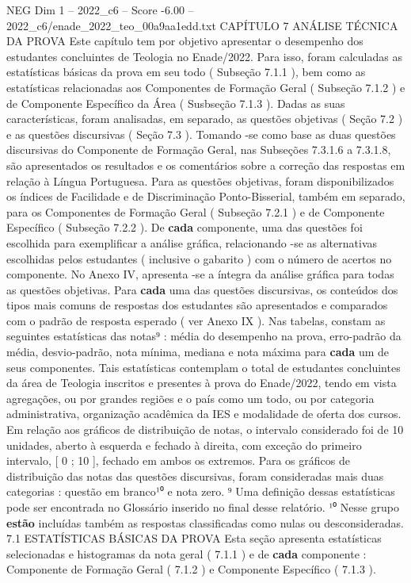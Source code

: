 \begin{textsample}{NEG Dim 1 – 2022\_c6 – Score -6.00 – 2022\_c6/enade\_2022\_teo\_00a9aa1edd.txt}  \label{ex:f1_neg_183}
CAPÍTULO 7 ANÁLISE TÉCNICA DA PROVA Este capítulo tem por objetivo apresentar o desempenho dos estudantes concluintes de Teologia no Enade/2022.
Para isso, foram calculadas as estatísticas básicas da prova em seu todo ( Subseção 7.1.1 ), bem como as estatísticas relacionadas aos Componentes de Formação Geral ( Subseção 7.1.2 ) e de Componente Específico da Área ( Susbseção 7.1.3 ).
Dadas as suas características, foram analisadas, em separado, as questões objetivas ( Seção 7.2 ) e as questões discursivas ( Seção 7.3 ).
Tomando -se como base as duas questões discursivas do Componente de Formação Geral, nas Subseções 7.3.1.6 a 7.3.1.8, são apresentados os resultados e os comentários sobre a correção das respostas em relação à Língua Portuguesa.
Para as questões objetivas, foram disponibilizados os índices de Facilidade e de Discriminação Ponto-Bisserial, também em separado, para os Componentes de Formação Geral ( Subseção 7.2.1 ) e de Componente Específico ( Subseção 7.2.2 ).
De \textbf{cada} componente, uma das questões foi escolhida para exemplificar a análise gráfica, relacionando -se as alternativas escolhidas pelos estudantes ( inclusive o gabarito ) com o número de acertos no componente.
No Anexo IV, apresenta -se a íntegra da análise gráfica para todas as questões objetivas.
Para \textbf{cada} uma das questões discursivas, os conteúdos dos tipos mais comuns de respostas dos estudantes são apresentados e comparados com o padrão de resposta esperado ( ver Anexo IX ).
Nas tabelas, constam as seguintes estatísticas das notas⁹ : média do desempenho na prova, erro-padrão da média, desvio-padrão, nota mínima, mediana e nota máxima para \textbf{cada} um de seus componentes.
Tais estatísticas contemplam o total de estudantes concluintes da área de Teologia inscritos e presentes à prova do Enade/2022, tendo em vista agregações, ou por grandes regiões e o país como um todo, ou por categoria administrativa, organização acadêmica da IES e modalidade de oferta dos cursos.
Em relação aos gráficos de distribuição de notas, o intervalo considerado foi de 10 unidades, aberto à esquerda e fechado à direita, com exceção do primeiro intervalo, [ 0 ; 10 ], fechado em ambos os extremos.
Para os gráficos de distribuição das notas das questões discursivas, foram consideradas mais duas categorias : questão em branco¹⁰ e nota zero. ⁹ Uma definição dessas estatísticas pode ser encontrada no Glossário inserido no final desse relatório. ¹⁰ Nesse grupo \textbf{estão} incluídas também as respostas classificadas como nulas ou desconsideradas. 7.1 ESTATÍSTICAS BÁSICAS DA PROVA Esta seção apresenta estatísticas selecionadas e histogramas da nota geral ( 7.1.1 ) e de \textbf{cada} componente : Componente de Formação Geral ( 7.1.2 ) e Componente Específico ( 7.1.3 ).

\end{textsample}
